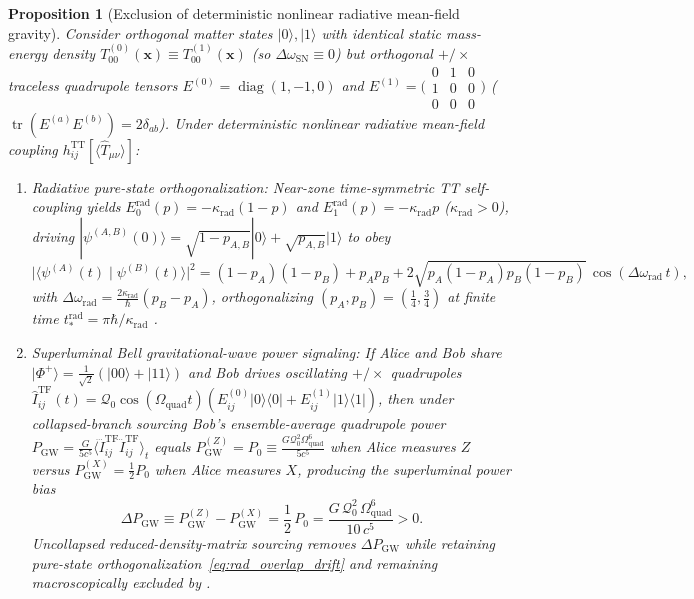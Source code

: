 \documentclass[aps,prd,onecolumn,tightenlines,nofootinbib,notitlepage,10pt,floatfix]{revtex4-2}
\theoremstyle{indentedtheorem}
\newtheorem{proposition}{Proposition}
\begin{document}
\begin{proposition}[Exclusion of deterministic nonlinear radiative mean-field gravity]\label{prop:rad_meanfield_signaling}
Consider orthogonal matter states $|0\rangle,|1\rangle$ with identical static mass-energy density $T_{00}^{(0)}(\mathbf{x})\equiv T_{00}^{(1)}(\mathbf{x})$ (so $\Delta\omega_\text{SN}\equiv 0$) but orthogonal $+/\times$ traceless quadrupole tensors $E^{(0)}=\operatorname{diag}(1,-1,0)$ and $E^{(1)}=\bigl(\begin{smallmatrix}0&1&0\\1&0&0\\0&0&0\end{smallmatrix}\bigr)$ ($\operatorname{tr}(E^{(a)}E^{(b)})=2\delta_{ab}$). Under deterministic nonlinear radiative mean-field coupling $h_{ij}^\text{TT}[\langle\hat{T}_{\mu\nu}\rangle]$:
\begin{enumerate}[label=(\roman*)]
\item \emph{Radiative pure-state orthogonalization:} Near-zone time-symmetric TT self-coupling yields $E_0^\text{rad}(p)=-\kappa_\text{rad}(1-p)$ and $E_1^\text{rad}(p)=-\kappa_\text{rad}p$ ($\kappa_\text{rad}>0$), driving $|\psi^{(A,B)}(0)\rangle=\sqrt{1-p_{A,B}}|0\rangle+\sqrt{p_{A,B}}|1\rangle$ to obey
\begin{equation}
    \big|\langle\psi^{(A)}(t)\mid\psi^{(B)}(t)\rangle\big|^2 = (1-p_A)(1-p_B) + p_A p_B + 2\sqrt{p_A(1-p_A)p_B(1-p_B)}\,\cos(\Delta\omega_\text{rad}\,t) ,
    \label{eq:rad_overlap_drift}
\end{equation}
with $\Delta\omega_\text{rad}=\frac{2\kappa_\text{rad}}{\hbar}(p_B-p_A)$, orthogonalizing $(p_A,p_B)=(\tfrac{1}{4},\tfrac{3}{4})$ at finite time $t_*^\text{rad}=\pi\hbar/\kappa_\text{rad}$ \citep{Polchinski1991}.
\item \emph{Superluminal Bell gravitational-wave power signaling:} If Alice and Bob share $|\Phi^+\rangle=\tfrac{1}{\sqrt{2}}(|00\rangle+|11\rangle)$ and Bob drives oscillating $+/\times$ quadrupoles $\hat{I}_{ij}^\text{TF}(t)=\mathcal{Q}_0\cos(\Omega_\text{quad}t)(E_{ij}^{(0)}|0\rangle\langle 0|+E_{ij}^{(1)}|1\rangle\langle 1|)$, then under collapsed-branch sourcing Bob's ensemble-average quadrupole power $P_\text{GW}=\frac{G}{5c^5}\langle\dddot{I}_{ij}^\text{TF}\dddot{I}_{ij}^\text{TF}\rangle_t$ equals $P_\text{GW}^{(Z)}=P_0\equiv\frac{G\mathcal{Q}_0^2\Omega_\text{quad}^6}{5c^5}$ when Alice measures $Z$ versus $P_\text{GW}^{(X)}=\tfrac{1}{2}P_0$ when Alice measures $X$, producing the superluminal power bias
\begin{equation}
    \Delta P_\text{GW} \equiv P_\text{GW}^{(Z)} - P_\text{GW}^{(X)} = \frac{1}{2}\,P_0 = \frac{G\,\mathcal{Q}_0^2\,\Omega_\text{quad}^6}{10\,c^5} > 0 .
    \label{eq:gw_power_bias}
\end{equation}
Uncollapsed reduced-density-matrix sourcing removes $\Delta P_\text{GW}$ while retaining pure-state orthogonalization~\eqref{eq:rad_overlap_drift} \citep{Polchinski1991} and remaining macroscopically excluded by \citet{PageGeilker1981Indirect}.
\end{enumerate}
\end{proposition}
\end{document}
